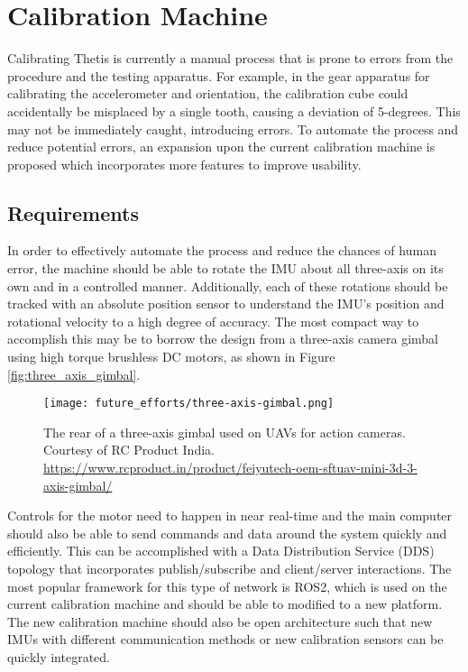 \section{Calibration Machine} 
Calibrating Thetis is currently a manual process that is prone to errors from the procedure and the testing apparatus.
For example, in the gear apparatus for calibrating the accelerometer and orientation, the calibration cube could accidentally be misplaced by a single tooth, causing a deviation of 5-degrees.
This may not be immediately caught, introducing errors.
To automate the process and reduce potential errors, an expansion upon the current calibration machine is proposed which incorporates more features to improve usability.

\subsection{Requirements} 
In order to effectively automate the process and reduce the chances of human error, the machine should be able to rotate the IMU about all three-axis on its own and in a controlled manner.
Additionally, each of these rotations should be tracked with an absolute position sensor to understand the IMU's position and rotational velocity to a high degree of accuracy.
The most compact way to accomplish this may be to borrow the design from a three-axis camera gimbal using high torque brushless DC motors, as shown in Figure \ref{fig:three_axis_gimbal}.

\begin{figure}
    \centering
    \caption[Three Axis Gimbal]{The rear of a three-axis gimbal used on UAVs for action cameras. 
    Courtesy of RC Product India. \url{https://www.rcproduct.in/product/feiyutech-oem-sftuav-mini-3d-3-axis-gimbal/}}
    \texttt{[image: future\_efforts/three-axis-gimbal.png]}
\end{figure}

Controls for the motor need to happen in near real-time and the main computer should also be able to send commands and data around the system quickly and efficiently.
This can be accomplished with a Data Distribution Service (DDS) topology that incorporates publish/subscribe and client/server interactions.
The most popular framework for this type of network is ROS2, which is used on the current calibration machine and should be able to modified to a new platform.
The new calibration machine should also be open architecture such that new IMUs with different communication methods or new calibration sensors can be quickly integrated.

